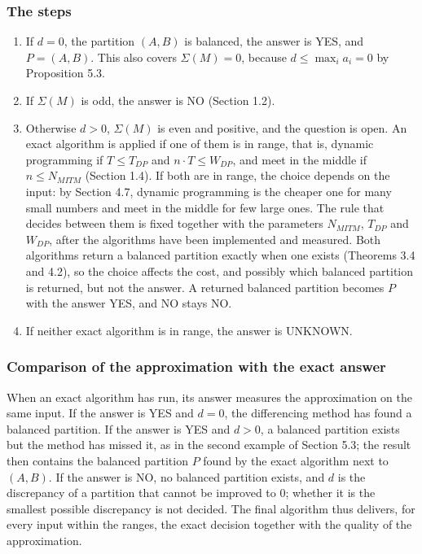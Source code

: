 \documentclass[
]{article}
\providecommand{\tightlist}{%
  \setlength{\itemsep}{0pt}\setlength{\parskip}{0pt}}
\begin{document}
\hypertarget{the-steps}{%
\subsubsection{The steps}\label{the-steps}}

\begin{enumerate}
\def\labelenumi{\arabic{enumi}.}
\tightlist
\item
  If \(d = 0\), the partition \((A, B)\) is balanced, the answer is YES,
  and \(P = (A, B)\). This also covers \(\Sigma(M) = 0\), because
  \(d \le \max_i a_i = 0\) by Proposition 5.3.
\item
  If \(\Sigma(M)\) is odd, the answer is NO (Section 1.2).
\item
  Otherwise \(d > 0\), \(\Sigma(M)\) is even and positive, and the
  question is open. An exact algorithm is applied if one of them is in
  range, that is, dynamic programming if \(T \le T_{DP}\) and
  \(n \cdot T \le W_{DP}\), and meet in the middle if \(n \le N_{MITM}\)
  (Section 1.4). If both are in range, the choice depends on the input:
  by Section 4.7, dynamic programming is the cheaper one for many small
  numbers and meet in the middle for few large ones. The rule that
  decides between them is fixed together with the parameters
  \(N_{MITM}\), \(T_{DP}\) and \(W_{DP}\), after the algorithms have
  been implemented and measured. Both algorithms return a balanced
  partition exactly when one exists (Theorems 3.4 and 4.2), so the
  choice affects the cost, and possibly which balanced partition is
  returned, but not the answer. A returned balanced partition becomes
  \(P\) with the answer YES, and NO stays NO.
\item
  If neither exact algorithm is in range, the answer is UNKNOWN.
\end{enumerate}

\hypertarget{comparison-of-the-approximation-with-the-exact-answer}{%
\subsubsection{Comparison of the approximation with the exact
answer}\label{comparison-of-the-approximation-with-the-exact-answer}}

When an exact algorithm has run, its answer measures the approximation
on the same input. If the answer is YES and \(d = 0\), the differencing
method has found a balanced partition. If the answer is YES and
\(d > 0\), a balanced partition exists but the method has missed it, as
in the second example of Section 5.3; the result then contains the
balanced partition \(P\) found by the exact algorithm next to
\((A, B)\). If the answer is NO, no balanced partition exists, and \(d\)
is the discrepancy of a partition that cannot be improved to \(0\);
whether it is the smallest possible discrepancy is not decided. The
final algorithm thus delivers, for every input within the ranges, the
exact decision together with the quality of the approximation.
\end{document}
